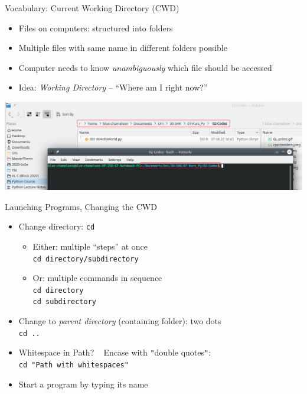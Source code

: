 \begin{frame}{Vocabulary: Current Working Directory (CWD)}
%
\begin{itemize}
\item Files on computers: structured into folders
\item Multiple files with same name in different folders possible
\item Computer needs to know \emph{unambiguously} which file should be accessed
\item Idea: \emph{Working Directory} -- \enquote{Where am I right now?}
\end{itemize}
%
\includegraphics[width=\linewidth]{./gfx/paths}
%
\end{frame}


\begin{frame}{Launching Programs, Changing the CWD}
%
\begin{itemize}
\item Change directory: \texttt{cd}
	\begin{minipage}{\linewidth}
		\begin{minipage}{.49\linewidth}
		\begin{itemize}
		\item Either: multiple \enquote{steps} at once\\
			\texttt{cd directory/subdirectory}
		\end{itemize}
		\end{minipage}
		\begin{minipage}{.49\linewidth}
		\begin{itemize}
		\item Or: multiple commands in sequence\\
			\texttt{cd directory}\\
			\texttt{cd subdirectory}
		\end{itemize}
		\end{minipage}
	\end{minipage}
	\item Change to \emph{parent directory} (containing folder): two dots\\
		\texttt{cd ..}
	\item Whitespace in Path? \Thus ~ Encase with \texttt{"}double quotes\texttt{"}:\\
		\texttt{cd "Path with whitespaces"}
\item Start a program by typing its name
\end{itemize}
%
\end{frame}

